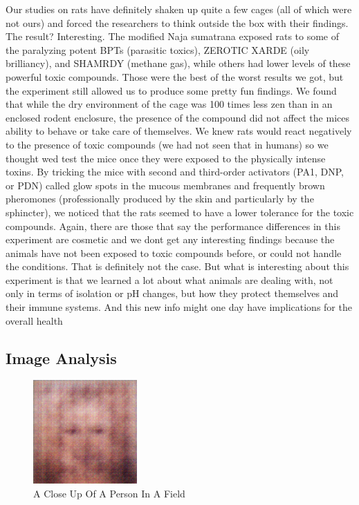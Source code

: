 \documentclass{article}%
\begin{document}
Our studies on rats have definitely shaken up quite a few cages (all of which were not ours) and forced the researchers to think outside the box with their findings.\newline%
The result? Interesting.\newline%
The modified Naja sumatrana exposed rats to some of the paralyzing potent BPTs (parasitic toxics), ZEROTIC XARDE (oily brilliancy), and SHAMRDY (methane gas), while others had lower levels of these powerful toxic compounds.\newline%
Those were the best of the worst results we got, but the experiment still allowed us to produce some pretty fun findings.\newline%
We found that while the dry environment of the cage was 100 times less zen than in an enclosed rodent enclosure, the presence of the compound did not affect the mices ability to behave or take care of themselves.\newline%
We knew rats would react negatively to the presence of toxic compounds (we had not seen that in humans) so we thought wed test the mice once they were exposed to the physically intense toxins.\newline%
By tricking the mice with second and third{-}order activators (PA1, DNP, or PDN) called glow spots in the mucous membranes and frequently brown pheromones (professionally produced by the skin and particularly by the sphincter), we noticed that the rats seemed to have a lower tolerance for the toxic compounds.\newline%
Again, there are those that say the performance differences in this experiment are cosmetic and we dont get any interesting findings because the animals have not been exposed to toxic compounds before, or could not handle the conditions.\newline%
That is definitely not the case.\newline%
But what is interesting about this experiment is that we learned a lot about what animals are dealing with, not only in terms of isolation or pH changes, but how they protect themselves and their immune systems.\newline%
And this new info might one day have implications for the overall health

%
\subsection{Image Analysis}%
\label{subsec:ImageAnalysis}%


\begin{figure}[h!]%
\centering%
\includegraphics[width=150px]{500_fake_images/samples_5_140.png}%
\caption{A Close Up Of A Person In A Field}%
\end{figure}

%
\end{document}
